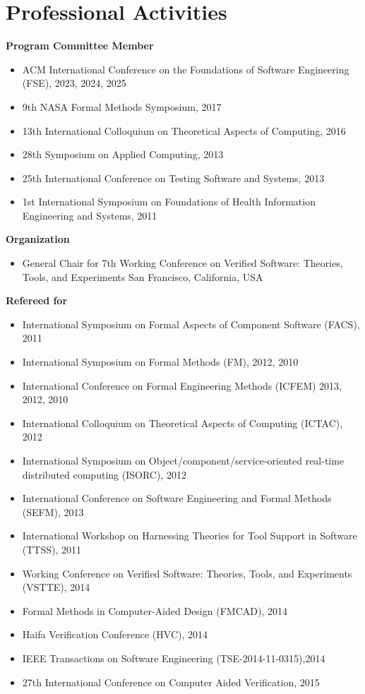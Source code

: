 \bigskip
\section{\sc Professional Activities}

\textbf{Program Committee Member}
\begin{itemize}
  \item ACM International Conference on the Foundations of Software Engineering (FSE), 2023, 2024, 2025
  \item 9th NASA Formal Methods Symposium, 2017 
  \item 13th International Colloquium on Theoretical Aspects of Computing, 2016
  \item 28th Symposium on Applied Computing, 2013
  \item 25th International Conference on Testing Software and Systems, 2013 
  \item 1st International Symposium on Foundations of Health Information Engineering and Systems, 2011   
\end{itemize}

\textbf{Organization}
\begin{itemize}
  \item General Chair for 7th Working Conference on Verified Software: Theories, Tools, and Experiments
San Francisco, California, USA
\end{itemize}

\textbf{Refereed for}
\begin{itemize}
  \item International Symposium on Formal Aspects of Component Software (FACS), 2011  
  \item International Symposium on Formal Methods (FM), 2012, 2010
  \item International Conference on Formal Engineering Methods (ICFEM) 2013, 2012, 2010
  \item International Colloquium on Theoretical Aspects of Computing (ICTAC), 2012
  \item International Symposium on Object/component/service-oriented real-time distributed computing (ISORC), 2012  
  \item International Conference on Software Engineering and Formal Methods (SEFM), 2013
  \item International Workshop on Harnessing Theories for Tool Support in Software (TTSS), 2011  
  \item Working Conference on Verified Software: Theories, Tools, and
  Experiments (VSTTE), 2014
  \item Formal Methods in Computer-Aided Design (FMCAD), 2014
  \item Haifa Verification Conference (HVC), 2014
  \item IEEE Transactions on Software Engineering (TSE-2014-11-0315),2014
  \item 27th International Conference on Computer Aided Verification, 2015
\end{itemize}

\bigskip